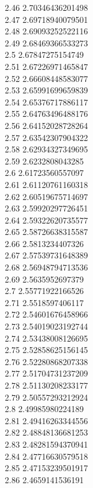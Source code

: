 {2.46	2.70346436201498\\
2.47	2.69718940079501\\
2.48	2.69093252522116\\
2.49	2.68469366533273\\
2.5	2.67847275154749\\
2.51	2.67226971465847\\
2.52	2.66608448583077\\
2.53	2.65991699659839\\
2.54	2.65376717886117\\
2.55	2.64763496488176\\
2.56	2.64152028728264\\
2.57	2.63542307904322\\
2.58	2.62934327349695\\
2.59	2.6232808043285\\
2.6	2.61723560557097\\
2.61	2.61120761160318\\
2.62	2.60519675714697\\
2.63	2.59920297726451\\
2.64	2.59322620735577\\
2.65	2.58726638315587\\
2.66	2.5813234407326\\
2.67	2.57539731648389\\
2.68	2.56948794713536\\
2.69	2.5635952697379\\
2.7	2.55771922166526\\
2.71	2.5518597406117\\
2.72	2.54601676458966\\
2.73	2.54019023192744\\
2.74	2.53438008126695\\
2.75	2.52858625156145\\
2.76	2.52280868207338\\
2.77	2.51704731237209\\
2.78	2.51130208233177\\
2.79	2.50557293212924\\
2.8	2.49985980224189\\
2.81	2.49416263344556\\
2.82	2.48848136681253\\
2.83	2.48281594370941\\
2.84	2.47716630579518\\
2.85	2.47153239501917\\
2.86	2.4659141536191\\
}
